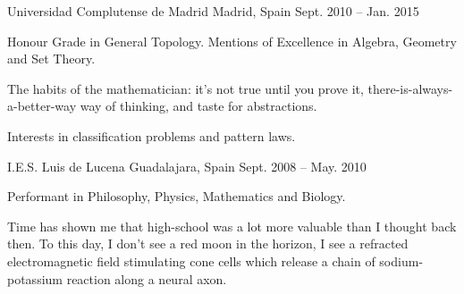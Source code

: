 
\begin{cventries}

    {Universidad Complutense de Madrid} %
    {Madrid, Spain} %
    {Sept. 2010 -- Jan. 2015} %
    {
        \begin{cvitems} %
            \item {Honour Grade in General Topology. Mentions of Excellence in Algebra, Geometry and Set Theory.}
            \item {The habits of the mathematician: it's not true until you prove it, there-is-always-a-better-way way of thinking, and taste for abstractions.}
            \item {Interests in classification problems and pattern laws.}
        \end{cvitems}
    }

    {I.E.S. Luis de Lucena} %
    {Guadalajara, Spain} %
    {Sept. 2008 -- May. 2010} %
    {
        \begin{cvitems} %
            \item {Performant in Philosophy, Physics, Mathematics and Biology.}
            \item {Time has shown me that high-school was a lot more valuable than I thought back then. To this day, I don't see a red moon in the horizon, I see a refracted electromagnetic field stimulating cone cells which release a chain of sodium-potassium reaction along a neural axon.}
        \end{cvitems}
    }

\end{cventries}
